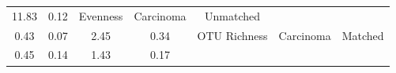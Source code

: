 \documentclass[12pt,]{article}
\begin{document}
\begin{longtable}[]{@{}ccccccc@{}}
\begin{minipage}[t]{0.16\columnwidth}
11.83\strut
\end{minipage} & \begin{minipage}[t]{0.07\columnwidth}\centering\strut
0.12\strut
\end{minipage} & \begin{minipage}[t]{0.14\columnwidth}\centering\strut
Evenness\strut
\end{minipage} & \begin{minipage}[t]{0.09\columnwidth}\centering\strut
Carcinoma\strut
\end{minipage} & \begin{minipage}[t]{0.11\columnwidth}\centering\strut
Unmatched\strut
\end{minipage}\tabularnewline
\begin{minipage}[t]{0.09\columnwidth}\centering\strut
0.43\strut
\end{minipage} & \begin{minipage}[t]{0.16\columnwidth}\centering\strut
0.07\strut
\end{minipage} & \begin{minipage}[t]{0.16\columnwidth}\centering\strut
2.45\strut
\end{minipage} & \begin{minipage}[t]{0.07\columnwidth}\centering\strut
0.34\strut
\end{minipage} & \begin{minipage}[t]{0.14\columnwidth}\centering\strut
OTU Richness\strut
\end{minipage} & \begin{minipage}[t]{0.09\columnwidth}\centering\strut
Carcinoma\strut
\end{minipage} & \begin{minipage}[t]{0.11\columnwidth}\centering\strut
Matched\strut
\end{minipage}\tabularnewline
\begin{minipage}[t]{0.09\columnwidth}\centering\strut
0.45\strut
\end{minipage} & \begin{minipage}[t]{0.16\columnwidth}\centering\strut
0.14\strut
\end{minipage} & \begin{minipage}[t]{0.16\columnwidth}\centering\strut
1.43\strut
\end{minipage} & \begin{minipage}[t]{0.07\columnwidth}\centering\strut
0.17\strut
\end{minipage} & \begin{minipage}[t]{0.14\columnwidth}\centering\strut

\end{minipage}
\end{longtable}
\end{document}
